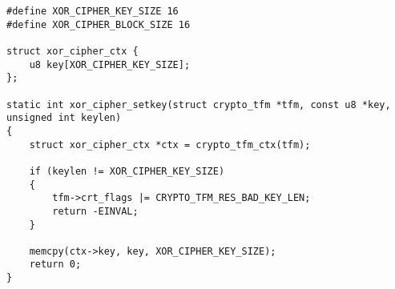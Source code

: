 \begin{verbatim}
#define XOR_CIPHER_KEY_SIZE 16
#define XOR_CIPHER_BLOCK_SIZE 16

struct xor_cipher_ctx {
    u8 key[XOR_CIPHER_KEY_SIZE];
};

static int xor_cipher_setkey(struct crypto_tfm *tfm, const u8 *key,
unsigned int keylen)
{
    struct xor_cipher_ctx *ctx = crypto_tfm_ctx(tfm);

    if (keylen != XOR_CIPHER_KEY_SIZE)
    {
        tfm->crt_flags |= CRYPTO_TFM_RES_BAD_KEY_LEN;
        return -EINVAL;
    }

    memcpy(ctx->key, key, XOR_CIPHER_KEY_SIZE);
    return 0;
}
\end{verbatim}
